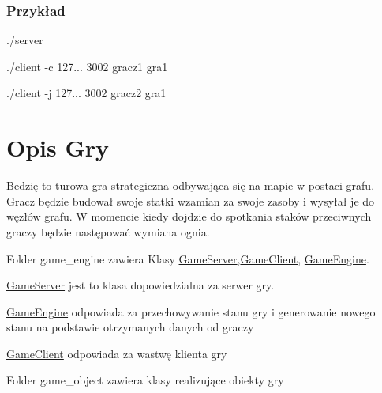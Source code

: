 \subsubsection*{Przykład}


\begin{DoxyItemize}
\item ./server
\item ./client -\/c 127... 3002 gracz1 gra1
\item ./client -\/j 127... 3002 gracz2 gra1
\end{DoxyItemize}

\section*{Opis Gry}

Bedzię to turowa gra strategiczna odbywająca się na mapie w postaci grafu. Gracz będzie budował swoje statki wzamian za swoje zasoby i wysyłał je do węzłów grafu. W momencie kiedy dojdzie do spotkania staków przeciwnych graczy będzie następować wymiana ognia.


\begin{DoxyItemize}
\item Folder game\+\_\+engine zawiera Klasy \hyperlink{classGameServer}{Game\+Server},\hyperlink{classGameClient}{Game\+Client}, \hyperlink{classGameEngine}{Game\+Engine}.
\end{DoxyItemize}

\hyperlink{classGameServer}{Game\+Server} jest to klasa dopowiedzialna za serwer gry.

\hyperlink{classGameEngine}{Game\+Engine} odpowiada za przechowywanie stanu gry i generowanie nowego stanu na podstawie otrzymanych danych od graczy

\hyperlink{classGameClient}{Game\+Client} odpowiada za wastwę klienta gry


\begin{DoxyItemize}
\item Folder game\+\_\+object zawiera klasy realizujące obiekty gry
\end{DoxyItemize}

